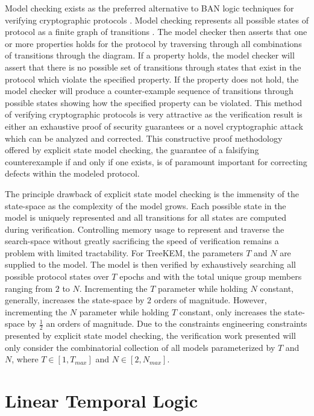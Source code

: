 Model checking exists as the preferred alternative to BAN logic techniques for verifying cryptographic protocols \autocite{kacprzak2006comparing} \autocite{lomuscio2007verification} \autocite{van2004symbolic}.
Model checking represents all possible states of protocol as a finite graph of transitions \autocite{clarke1981design}.
The model checker then asserts that one or more properties holds for the protocol by traversing through all combinations of transitions through the diagram.
If a property holds, the model checker will assert that there is no possible set of transitions through states that exist in the protocol which violate the specified property.
If the property does not hold, the model checker will produce a counter-example sequence of transitions through possible states showing how the specified property can be violated.
This method of verifying cryptographic protocols is very attractive as the verification result is either an exhaustive proof of security guarantees or a novel cryptographic attack which can be analyzed and corrected.
This constructive proof methodology offered by explicit state model checking, the guarantee of a falsifying counterexample if and only if one exists, is of paramount important for correcting defects within the modeled protocol.

The principle drawback of explicit state model checking is the immensity of the state-space as the complexity of the model grows.
Each possible state in the model is uniquely represented and all transitions for all states are computed during verification.
Controlling memory usage to represent and traverse the search-space without greatly sacrificing the speed of verification remains a problem with limited tractability.
For TreeKEM, the parameters \(T\) and \(N\) are supplied to the model.
The model is then verified by exhaustively searching all possible protocol states over \(T\) epochs and with the total unique group members ranging from \(2\) to \(N\).
Incrementing the \(T\) parameter while holding \(N\) constant, generally, increases the state-space by \(2\) orders of magnitude.
However, incrementing the \(N\) parameter while holding \(T\) constant, only increases the state-space by \(\frac{1}{2}\) an orders of magnitude.
Due to the constraints engineering constraints presented by explicit state model checking, the verification work presented will only consider the combinatorial collection of all models parameterized by \(T\) and \(N\), where \(T \in [1, T_{max}]\) and \(N \in [2, N_{max}]\).

\hypertarget{linear-temporal-logic}{%
\section{Linear Temporal Logic}\label{linear-temporal-logic}}

